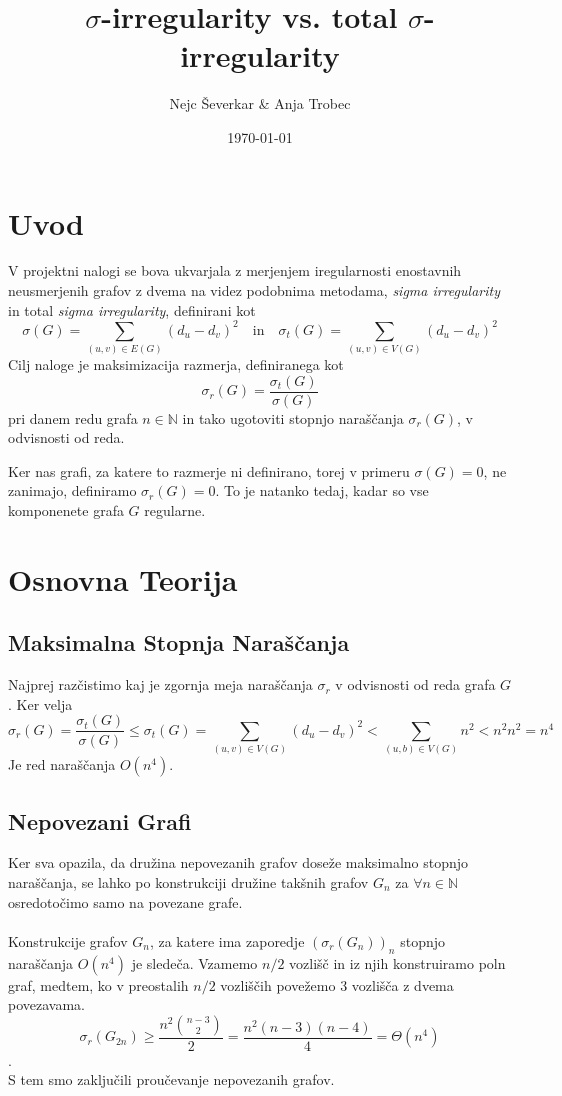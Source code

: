 \documentclass[ letterpaper, titlepage, fleqn]{article}
\begin{document}
\title{$\sigma$-irregularity vs. total $\sigma$-irregularity}
\author{Nejc Ševerkar \& Anja Trobec}
\date{\today}
\maketitle

\section{Uvod}
V projektni nalogi se bova ukvarjala z merjenjem iregularnosti enostavnih neusmerjenih grafov z
dvema na videz podobnima metodama, {\em sigma irregularity} in total {\em sigma irregularity},
definirani kot 
$$
\sigma(G) = \sum_{(u, v) \in E(G)}(d_u - d_v)^2 
\quad \text{in} \quad
\sigma_t(G) = \sum_{(u, v) \in V(G)}(d_u - d_v)^2
$$
Cilj naloge je maksimizacija razmerja, definiranega kot 
$$\sigma_r(G) = \frac{\sigma_t(G)}{\sigma(G)}$$
pri danem redu grafa $n \in \mathbb{N}$ in tako ugotoviti 
stopnjo naraščanja $\sigma_r(G)$, v odvisnosti od reda.

Ker nas grafi, za katere to razmerje ni definirano,
torej v primeru $\sigma(G) = 0$, ne zanimajo, definiramo $\sigma_r(G) = 0$.
To je natanko tedaj, kadar so vse komponenete grafa $G$ regularne.

\section{Osnovna Teorija}

\subsection{Maksimalna Stopnja Naraščanja}
Najprej razčistimo kaj je zgornja meja naraščanja $\sigma_r$ v odvisnosti
od reda grafa $G$. Ker velja
$$
\sigma_r(G) = \frac{\sigma_t(G)}{\sigma(G)} 
\leq \sigma_t(G)
= \sum_{(u, v) \in V(G)}(d_u - d_v)^2 
< \sum_{(u, b) \in V(G)}n^2
< n^2  n^2 = n^4
$$
Je red naraščanja $O(n^4)$.

\subsection{Nepovezani Grafi}
Ker sva opazila, da družina nepovezanih grafov doseže maksimalno stopnjo naraščanja,
se lahko po konstrukciji družine takšnih grafov $G_n$ za $\forall n \in \mathbb{N}$
osredotočimo samo na povezane grafe.
\\\\
Konstrukcije grafov $G_n$, za katere ima zaporedje $(\sigma_r(G_n))_n$ stopnjo 
naraščanja $O(n^4)$ je sledeča.
Vzamemo $n / 2$ vozlišč in iz njih konstruiramo poln graf, 
medtem, ko v preostalih $n /2$ vozliščih povežemo 3 vozlišča z dvema povezavama.
$$\sigma_r(G_{2n}) \geq \frac{n^2 \binom{n - 3}{2}}{2} = \frac{n^2 (n - 3)(n - 4)}{4} = \Theta(n^4)$$.
\\
S tem smo zaključili proučevanje nepovezanih grafov.
\end{document}
